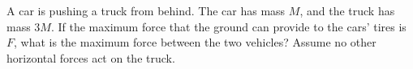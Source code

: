 A car is pushing a truck from behind. The car has mass $M$, and the
truck has mass $3M$. If the maximum force that the ground can provide
to the cars' tires is $F$, what is the maximum force between
the two vehicles? Assume no other horizontal forces act on the truck.\answercheck
